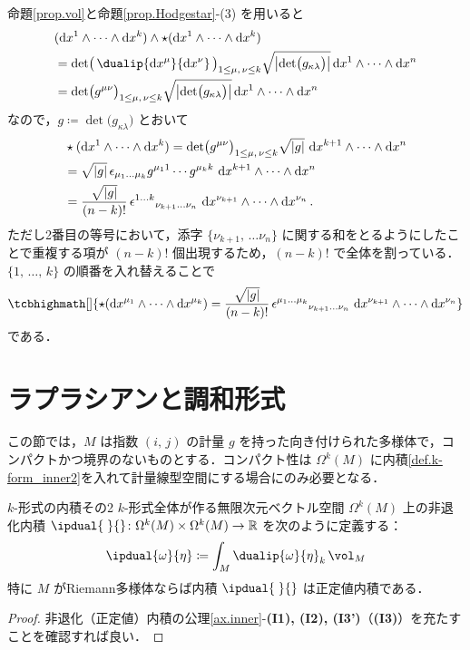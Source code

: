 \documentclass[geometry_main]{subfiles}
\begin{document}
命題\ref{prop.vol}と命題\ref{prop.Hodgestar}-(3) を用いると
\begin{align} 
	&(\dd{x^{1}} \wedge \cdots \wedge \dd{x^k}) \wedge \star (\dd{x^1} \wedge \cdots \wedge \dd{x^k}) \\
	&= \det \bigl( \, \dualip{\dd{x^\mu}}{\dd{x^\nu}}\, \bigr)_{1 \le \mu,\, \nu \le k} \sqrt{\abs{\det \bigl( g_{\kappa\lambda} \bigr) }} \dd{x^1} \wedge \cdots \wedge \dd{x^n} \\
	&= \det \bigl( g^{\mu\nu} \bigr)_{1 \le \mu,\, \nu \le k} \sqrt{\abs{\det \bigl( g_{\kappa\lambda} \bigr) }} \dd{x^1} \wedge \cdots \wedge \dd{x^n}
\end{align}
なので，$ g \coloneqq \det \bigl( g_{\kappa\lambda} \bigr)$ とおいて
\begin{align} 
	&\star (\dd{x^1} \wedge \cdots \wedge \dd{x^k}) = \det \bigl( g^{\mu\nu} \bigr)_{1 \le \mu,\, \nu \le k} \sqrt{\abs{g}}\, \dd{x^{k+1}} \wedge \cdots \wedge \dd{x^n} \\
	&= \sqrt{\abs{g}}\, \epsilon_{\mu_1 \dots \mu_k} g^{\mu_1 1} \cdots g^{\mu_k k}\, \dd{x^{k+1}} \wedge \cdots \wedge \dd{x^n} \\
	&= \frac{\sqrt{\abs{g}}}{(n-k)!}\, \epsilon^{1 \dots k}{}_{\nu_{k+1} \dots \nu_{n}} \, \dd{x^{\nu_{k+1}}} \wedge \cdots \wedge \dd{x^{\nu_n}}.
\end{align}
ただし2番目の等号において，添字 $\{ \nu_{k+1},\, \dots \nu_{n}\}$ に関する和をとるようにしたことで重複する項が $(n-k)!$ 個出現するため，$(n-k)!$ で全体を割っている．$\{1,\, \dots ,\, k\}$ の順番を入れ替えることで
\begin{align} 
	\label{eq.Hodge_action}
	\tcbhighmath[]{\star (\dd{x^{\mu_1}} \wedge \cdots \wedge \dd{x^{\mu_k}}) = \frac{\sqrt{\abs{g}}}{(n-k)!}\, \epsilon^{\mu_1 \dots \mu_k}{}_{\nu_{k+1} \dots \nu_{n}} \, \dd{x^{\nu_{k+1}}} \wedge \cdots \wedge \dd{x^{\nu_n}}}
\end{align}
である．

\section{ラプラシアンと調和形式}

この節では，$M$ は指数 $(i,\, j)$ の計量 $g$ を持った向き付けられた多様体で，コンパクトかつ境界のないものとする．コンパクト性は $\Omega^k(M)$ に内積\ref{def.k-form_inner2}を入れて計量線型空間にする場合にのみ必要となる．

\begin{mydef}[label=def.k-form_inner2]{$k$-形式の内積その2}
	$k$-形式全体が作る無限次元ベクトル空間 $\Omega^k(M)$ 上の非退化内積 $\ipdual{\;}{} \colon \Omega^k(M) \times \Omega^k(M) \to \mathbb{R}$ を次のように定義する：
	\begin{align} 
		\ipdual{\omega}{\eta} \coloneqq \int_M \dualip{\omega}{\eta}_k\, \vol_M
	\end{align}
	特に $M$ がRiemann多様体ならば内積 $\ipdual{\;}{}$ は正定値内積である．
\end{mydef}
\begin{proof} 
	非退化（正定値）内積の公理\ref{ax.inner}-\textbf{(I1), (I2), (I3')}（\textbf{(I3)}）を充たすことを確認すれば良い．
\end{proof}
\end{document}
